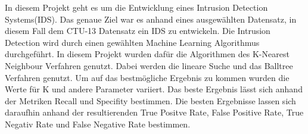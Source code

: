 \documentclass[main.tex]{subfiles}
\begin{document}
\author{Philipp Nickel}

\noindent 
In diesem Projekt geht es um die Entwicklung eines Intrusion Detection Systems(IDS). Das genaue Ziel war es anhand eines ausgewählten Datensatz, in diesem Fall dem CTU-13 Datensatz ein IDS zu entwickeln. Die Intrusion Detection  wird durch einen gewählten Machine Learning Algorithmus durchgeführt. In diesem Projekt wurden dafür die Algorithmen des K-Nearest Neighbour Verfahren genutzt. Dabei werden die lineare Suche und das Balltree Verfahren genutzt. Um auf das bestmögliche Ergebnis zu kommen wurden die Werte für K und andere Parameter variiert. Das beste Ergebnis lässt sich anhand der Metriken Recall und Specifity bestimmen. Die besten Ergebnisse lassen sich daraufhin anhand der resultierenden True Positve Rate, False Positive Rate, True Negativ Rate und False Negative Rate bestimmen.    
\end{document}
